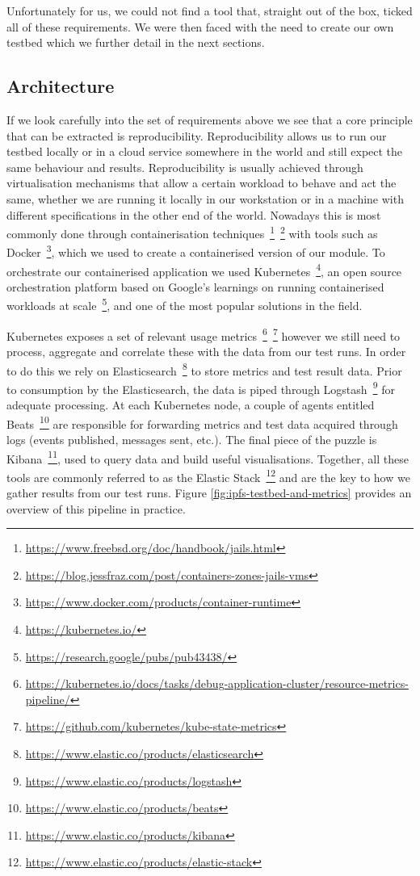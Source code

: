Unfortunately for us, we could not find a tool that, straight out of the box,
ticked all of these requirements. We were then faced with the need to create
our own testbed which we further detail in the next sections.

\subsection{Architecture}\label{subsec:testbed-architecture}

If we look carefully into the set of
requirements above we see that a core principle that can be extracted is
reproducibility. Reproducibility allows us to run our testbed locally or in a
cloud service somewhere in the world and still expect the same behaviour and
results. Reproducibility is usually achieved through virtualisation mechanisms
that allow a certain workload to behave and act the same, whether we are
running it locally in our workstation or in a machine with different
specifications in the other end of the world. Nowadays this is most commonly
done through containerisation
techniques~\footnote{\url{https://www.freebsd.org/doc/handbook/jails.html}}~\footnote{\url{https://blog.jessfraz.com/post/containers-zones-jails-vms}}
with tools such as
Docker~\footnote{\url{https://www.docker.com/products/container-runtime}}, which we
used to create a containerised version of our module. To orchestrate our
containerised application we used Kubernetes~\footnote{\url{https://kubernetes.io/}},
an open source orchestration platform based on Google's learnings on running
containerised workloads at
scale~\footnote{\url{https://research.google/pubs/pub43438/}}, and one of the most
popular solutions in the field.

Kubernetes exposes a set of relevant usage
metrics~\footnote{\url{https://kubernetes.io/docs/tasks/debug-application-cluster/resource-metrics-pipeline/}}~\footnote{\url{https://github.com/kubernetes/kube-state-metrics}}
however we still need to process, aggregate and correlate these with the data
from our test runs. In order to do this we rely on
Elasticsearch~\footnote{\url{https://www.elastic.co/products/elasticsearch}} to store
metrics and test result data. Prior to consumption by the Elasticsearch, the
data is piped through
Logstash~\footnote{\url{https://www.elastic.co/products/logstash}} for adequate
processing. At each Kubernetes node, a couple of agents entitled
Beats~\footnote{\url{https://www.elastic.co/products/beats}} are responsible for
forwarding metrics and test data acquired through logs (events published,
messages sent, etc.). The final piece of the puzzle is
Kibana~\footnote{\url{https://www.elastic.co/products/kibana}}, used to query data
and build useful visualisations. Together, all these tools are commonly
referred to as the Elastic
Stack~\footnote{\url{https://www.elastic.co/products/elastic-stack}} and are the key
to how we gather results from our test runs. Figure
\ref{fig:ipfs-testbed-and-metrics} provides an overview of this pipeline in
practice.

